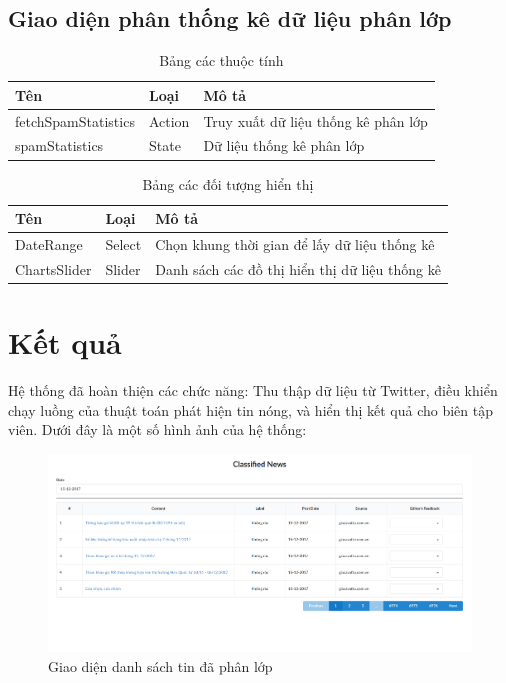   \subsection{Giao diện phân thống kê dữ liệu phân lớp}
  \begin{table}[H]
    \centering
    \setlength{\tabcolstep}{12pt}
    \begin{tabular}{@{}lll@{}} \toprule
      Tên  & Loại   & Mô tả \\ \midrule
      fetchSpamStatistics &  Action   &  Truy xuất dữ liệu thống kê phân lớp \\
      spamStatistics  &  State  & Dữ liệu thống kê phân lớp \\ \bottomrule
    \end{tabular}
    \caption{Bảng các thuộc tính}
  \end{table}

  \begin{table}[H]
    \centering
    \setlength{\tabcolstep}{12pt}
    \begin{tabular}{@{}lll@{}} \toprule
      Tên  & Loại   & Mô tả \\ \midrule
      DateRange   &  Select & Chọn khung thời gian để lấy dữ liệu thống kê \\
      ChartsSlider   & Slider &  Danh sách các đồ thị hiển thị dữ liệu thống kê \\ \bottomrule
    \end{tabular}
    \caption{Bảng các đối tượng hiển thị}
  \end{table}
\section{Kết quả}
Hệ thống đã hoàn thiện các chức năng: Thu thập dữ liệu từ Twitter, điều khiển chạy luồng của thuật toán phát hiện tin nóng, và hiển thị kết quả cho biên tập viên. Dưới đây là một số hình ảnh của hệ thống:

\begin{figure}[H]
	\centering
	\includegraphics[width=1\linewidth]{Chapter3/Chapter3Figs/Classified.png}
	\caption{Giao diện danh sách tin đã phân lớp}
	\label{fig:streaming}
\end{figure}

